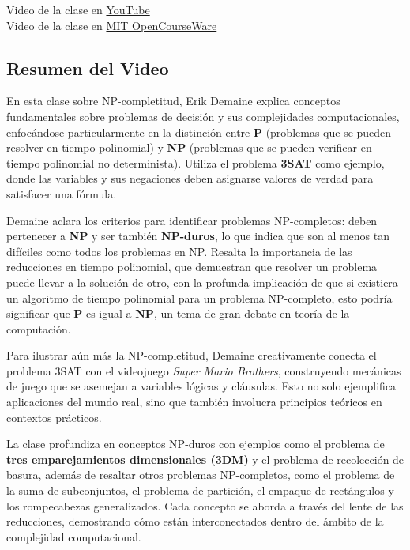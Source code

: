 \documentclass[letter, 12pt]{article}
\begin{document}
    Video de la clase en  \href{https://www.youtube.com/watch?v=eHZifpgyH_4&t=66s}{YouTube} \\
    Video de la clase en  \href{https://ocw.mit.edu/courses/6-046j-design-and-analysis-of-algorithms-spring-2015/resources/lecture-16-complexity-p-np-np-completeness-reductions/}{MIT OpenCourseWare}

    \subsection{Resumen del Video}
    En esta clase sobre NP-completitud, Erik Demaine explica conceptos fundamentales sobre problemas de decisión y sus complejidades computacionales, enfocándose particularmente en la distinción entre \textbf{P} (problemas que se pueden resolver en tiempo polinomial) y \textbf{NP} (problemas que se pueden verificar en tiempo polinomial no determinista). Utiliza el problema \textbf{3SAT} como ejemplo, donde las variables y sus negaciones deben asignarse valores de verdad para satisfacer una fórmula.

    Demaine aclara los criterios para identificar problemas NP-completos: deben pertenecer a \textbf{NP} y ser también \textbf{NP-duros}, lo que indica que son al menos tan difíciles como todos los problemas en NP. Resalta la importancia de las reducciones en tiempo polinomial, que demuestran que resolver un problema puede llevar a la solución de otro, con la profunda implicación de que si existiera un algoritmo de tiempo polinomial para un problema NP-completo, esto podría significar que \textbf{P} es igual a \textbf{NP}, un tema de gran debate en teoría de la computación.

    Para ilustrar aún más la NP-completitud, Demaine creativamente conecta el problema 3SAT con el videojuego \textit{Super Mario Brothers}, construyendo mecánicas de juego que se asemejan a variables lógicas y cláusulas. Esto no solo ejemplifica aplicaciones del mundo real, sino que también involucra principios teóricos en contextos prácticos.

    La clase profundiza en conceptos NP-duros con ejemplos como el problema de \textbf{tres emparejamientos dimensionales (3DM)} y el problema de recolección de basura, además de resaltar otros problemas NP-completos, como el problema de la suma de subconjuntos, el problema de partición, el empaque de rectángulos y los rompecabezas generalizados. Cada concepto se aborda a través del lente de las reducciones, demostrando cómo están interconectados dentro del ámbito de la complejidad computacional.
\end{document}
